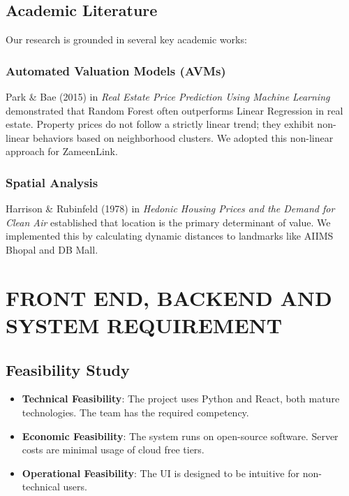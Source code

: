\documentclass[12pt,a4paper]{report}
\begin{document}
\section{Academic Literature}
Our research is grounded in several key academic works:

\subsection{Automated Valuation Models (AVMs)}
Park \& Bae (2015) in \textit{Real Estate Price Prediction Using Machine Learning} demonstrated that Random Forest often outperforms Linear Regression in real estate. Property prices do not follow a strictly linear trend; they exhibit non-linear behaviors based on neighborhood clusters. We adopted this non-linear approach for ZameenLink.

\subsection{Spatial Analysis}
Harrison \& Rubinfeld (1978) in \textit{Hedonic Housing Prices and the Demand for Clean Air} established that location is the primary determinant of value. We implemented this by calculating dynamic distances to landmarks like AIIMS Bhopal and DB Mall.

\chapter{FRONT END, BACKEND AND SYSTEM REQUIREMENT}

\section{Feasibility Study}
\begin{itemize}
    \item \textbf{Technical Feasibility}: The project uses Python and React, both mature technologies. The team has the required competency.
    \item \textbf{Economic Feasibility}: The system runs on open-source software. Server costs are minimal usage of cloud free tiers.
    \item \textbf{Operational Feasibility}: The UI is designed to be intuitive for non-technical users.
\end{itemize}
\end{document}
